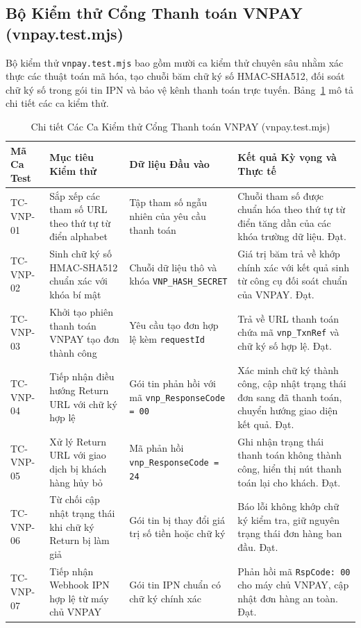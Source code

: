 \subsection{Bộ Kiểm thử Cổng Thanh toán VNPAY (vnpay.test.mjs)}
Bộ kiểm thử \texttt{vnpay.test.mjs} bao gồm mười ca kiểm thử chuyên sâu nhằm xác thực các thuật toán mã hóa, tạo chuỗi băm chữ ký số HMAC-SHA512, đối soát chữ ký số trong gói tin IPN và bảo vệ kênh thanh toán trực tuyến. Bảng~\ref{tab:test_vnpay_spec} mô tả chi tiết các ca kiểm thử.

\begin{table}[H]
\centering
\caption{Chi tiết Các Ca Kiểm thử Cổng Thanh toán VNPAY (vnpay.test.mjs)}
\label{tab:test_vnpay_spec}
\begin{tabularx}{\textwidth}{p{2cm}p{3.8cm}p{3cm}X}
\toprule
\textbf{Mã Ca Test} & \textbf{Mục tiêu Kiểm thử} & \textbf{Dữ liệu Đầu vào} & \textbf{Kết quả Kỳ vọng và Thực tế} \\
\midrule
TC-VNP-01 & Sắp xếp các tham số URL theo thứ tự từ điển alphabet & Tập tham số ngẫu nhiên của yêu cầu thanh toán & Chuỗi tham số được chuẩn hóa theo thứ tự từ điển tăng dần của các khóa trường dữ liệu. Đạt. \\
\addlinespace
TC-VNP-02 & Sinh chữ ký số HMAC-SHA512 chuẩn xác với khóa bí mật & Chuỗi dữ liệu thô và khóa \texttt{VNP\_HASH\_SECRET} & Giá trị băm trả về khớp chính xác với kết quả sinh từ công cụ đối soát chuẩn của VNPAY. Đạt. \\
\addlinespace
TC-VNP-03 & Khởi tạo phiên thanh toán VNPAY tạo đơn thành công & Yêu cầu tạo đơn hợp lệ kèm \texttt{requestId} & Trả về URL thanh toán chứa mã \texttt{vnp\_TxnRef} và chữ ký số hợp lệ. Đạt. \\
\addlinespace
TC-VNP-04 & Tiếp nhận điều hướng Return URL với chữ ký hợp lệ & Gói tin phản hồi với mã \texttt{vnp\_ResponseCode = 00} & Xác minh chữ ký thành công, cập nhật trạng thái đơn sang đã thanh toán, chuyển hướng giao diện kết quả. Đạt. \\
\addlinespace
TC-VNP-05 & Xử lý Return URL với giao dịch bị khách hàng hủy bỏ & Mã phản hồi \texttt{vnp\_ResponseCode = 24} & Ghi nhận trạng thái thanh toán không thành công, hiển thị nút thanh toán lại cho khách. Đạt. \\
\addlinespace
TC-VNP-06 & Từ chối cập nhật trạng thái khi chữ ký Return bị làm giả & Gói tin bị thay đổi giá trị số tiền hoặc chữ ký & Báo lỗi không khớp chữ ký kiểm tra, giữ nguyên trạng thái đơn hàng ban đầu. Đạt. \\
\addlinespace
TC-VNP-07 & Tiếp nhận Webhook IPN hợp lệ từ máy chủ VNPAY & Gói tin IPN chuẩn có chữ ký chính xác & Phản hồi mã \texttt{RspCode: 00} cho máy chủ VNPAY, cập nhật đơn hàng an toàn. Đạt. \\

\end{tabularx}
\end{table}
